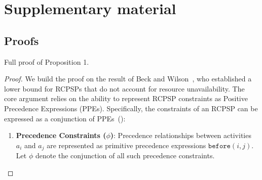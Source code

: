 \section*{Supplementary material}


\subsection*{Proofs}

Full proof of Proposition 1.
\begin{proof}
We build the proof on the result of Beck and Wilson~\cite{beck2007proactive}, who established a lower bound for RCPSPs that do not account for resource unavailability. The core argument relies on the ability to represent RCPSP constraints as Positive Precedence Expressions (PPEs).
Specifically, the constraints of an RCPSP can be expressed as a conjunction of PPEs~(\cite{beck2007proactive}):
\begin{enumerate}
    \item \textbf{Precedence Constraints (\( \phi \))}: Precedence relationships between activities \( a_i \) and \( a_j \) are represented as primitive precedence expressions \( \texttt{before}(i, j) \). Let \( \phi \) denote the conjunction of all such precedence constraints.


\end{enumerate}
\end{proof}
